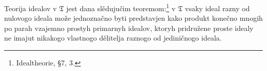 \documentclass[11pt]{article}
\newcommand{\mT}{\mathfrak{T}}
\begin{document}
\setcounter{footnote}{28}

\noindent Teorija idealov v $\mT$ jest dana slědujučim teoremom:\footnote{Idealtheorie, \S 7, 3.} v $\mT$ vsaky ideal razny od nulovogo ideala može jednoznačno byti predstavjen kako produkt konečno mnogih po parah vzajemno prostyh primarnyh idealov, ktoryh pridružene proste idealy ne imajut nikakogo vlastnogo dělitelja raznogo od jediničnogo ideala.
\end{document}
